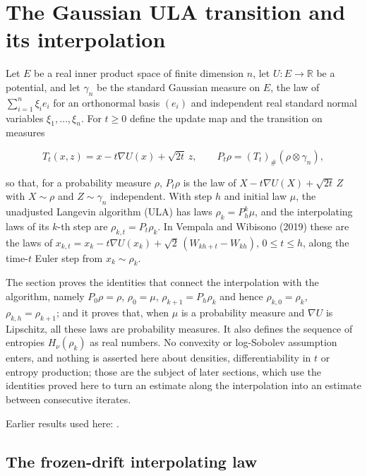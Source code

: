 \documentclass[11pt,a4paper]{report}
\begin{document}
\section{\texorpdfstring{The Gaussian ULA transition and its interpolation}{The Gaussian ULA transition and its interpolation}}
\label{proof-module-UnadjustedLangevin-LSI-ULALaw-lean}


Let \(E\) be a real inner product space of finite dimension \(n\), let \(U:E\to\mathbb R\) be a potential, and let \(\gamma_n\) be the standard Gaussian measure on \(E\), the law of \(\sum_{i=1}^n\xi_ie_i\) for an orthonormal basis \((e_i)\) and independent real standard normal variables \(\xi_1,\dots,\xi_n\). For \(t\ge0\) define the update map and the transition on measures


\[T_t(x,z)=x-t\nabla U(x)+\sqrt{2t}\,z,\qquad P_t\rho=(T_t)_\#(\rho\otimes\gamma_n),\]


so that, for a probability measure \(\rho\), \(P_t\rho\) is the law of \(X-t\nabla U(X)+\sqrt{2t}\,Z\) with \(X\sim\rho\) and \(Z\sim\gamma_n\) independent. With step \(h\) and initial law \(\mu\), the unadjusted Langevin algorithm (ULA) has laws \(\rho_k=P_h^k\mu\), and the interpolating laws of its \(k\)-th step are \(\rho_{k,t}=P_t\rho_k\). In Vempala and Wibisono (2019) these are the laws of \(x_{k,t}=x_k-t\nabla U(x_k)+\sqrt2\,(W_{kh+t}-W_{kh})\), \(0\le t\le h\), along the time-\(t\) Euler step from \(x_k\sim\rho_k\).




The section proves the identities that connect the interpolation with the algorithm, namely \(P_0\rho=\rho\), \(\rho_0=\mu\), \(\rho_{k+1}=P_h\rho_k\) and hence \(\rho_{k,0}=\rho_k\), \(\rho_{k,h}=\rho_{k+1}\); and it proves that, when \(\mu\) is a probability measure and \(\nabla U\) is Lipschitz, all these laws are probability measures. It also defines the sequence of entropies \(H_\nu(\rho_k)\) as real numbers. No convexity or log-Sobolev assumption enters, and nothing is asserted here about densities, differentiability in \(t\) or entropy production; those are the subject of later sections, which use the identities proved here to turn an estimate along the interpolation into an estimate between consecutive iterates.



Earlier results used here: \cite[Section~3.36]{LangevinLean2026ULASC}.
\subsection{\texorpdfstring{The frozen-drift interpolating law}{The frozen-drift interpolating law}}
\label{report-step-UnadjustedLangevin-LSI-ULALaw-lean-1}
\end{document}
